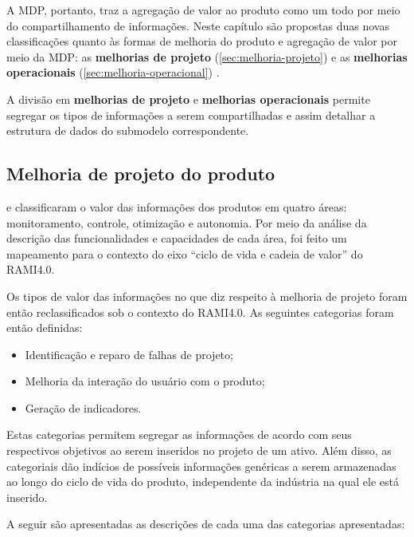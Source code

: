 A MDP, portanto, traz a agregação de valor ao produto como um todo por meio do compartilhamento de informações. Neste capítulo são propostas duas novas classificações quanto às formas de melhoria do produto e agregação de valor por meio da MDP: as \textbf{melhorias de projeto} (\autoref{sec:melhoria-projeto}) e as \textbf{melhorias operacionais} (\autoref{sec:melhoria-operacional}) .

A divisão em \textbf{melhorias de projeto} e \textbf{melhorias operacionais} permite segregar os tipos de informações a serem compartilhadas e assim detalhar a estrutura de dados do submodelo correspondente.

\subsection{Melhoria de projeto do produto}
\label{sec:melhoria-projeto}


 e  classificaram o valor das informações dos produtos em quatro áreas: monitoramento, controle, otimização e autonomia. Por meio da análise da descrição das funcionalidades e capacidades de cada área, foi feito um mapeamento para o contexto do eixo ``ciclo de vida e cadeia de valor'' do RAMI4.0.

Os tipos de valor das informações no que diz respeito à melhoria de projeto foram então reclassificados sob o contexto do RAMI4.0. As seguintes categorias foram então definidas:

\begin{itemize}
	\item Identificação e reparo de falhas de projeto;
	\item Melhoria da interação do usuário com o produto;
	\item Geração de indicadores.
\end{itemize}

Estas categorias permitem segregar as informações de acordo com seus respectivos objetivos ao serem inseridos no projeto de um ativo. Além disso, as categoriais dão indícios de possíveis informações genéricas a serem armazenadas ao longo do ciclo de vida do produto, independente da indústria na qual ele está inserido.

A seguir são apresentadas as descrições de cada uma das categorias apresentadas:


